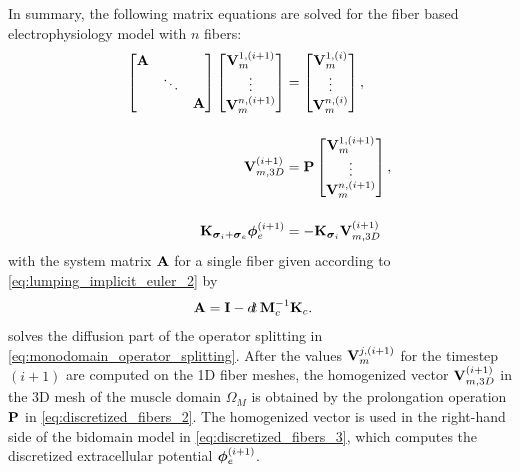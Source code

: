 In summary, the following matrix equations are solved for the fiber based electrophysiology model with $n$ fibers:
\begin{subequations}\label{eq:discretized_fibers}
  \begin{align}
    \left[\begin{array}{@{}ccc@{}}
      \bfA &&\\
      &\ddots&\\
      &&\bfA
    \end{array}\right]
    \left[\begin{array}{@{}c@{}}
      \bfV_{m}^{1,(i+1)}  \\
      \vdots\\
      \bfV_{m}^{n,(i+1)}
    \end{array}\right]
    &= 
    \left[\begin{array}{@{}c@{}}
      \bfV_{m}^{1,(i)}  \\
      \vdots\\
      \bfV_{m}^{n,(i)}
    \end{array}\right],\label{eq:discretized_fibers_1} \\[4mm]
    \bfV_{m,3D}^{(i+1)} &= \bfP \left[\begin{array}{@{}c@{}}
      \bfV_{m}^{1,(i+1)} \label{eq:discretized_fibers_2} \\
      \vdots\\
      \bfV_{m}^{n,(i+1)}
    \end{array}\right],\\[4mm]
    \bfK_{\bfsigma_i + \bfsigma_e} \bfphi_e^{(i+1)} &= -\bfK_{\bfsigma_i} \bfV_{m,3D}^{(i+1)} \label{eq:discretized_fibers_3}
  \end{align}
\end{subequations}
with the system matrix $\textbf{A}$ for a single fiber given according to \cref{eq:lumping_implicit_euler_2} by
\begin{align*}
  \bfA &= \bfI - \dt\,\bfM_c^{-1}\bfK_c.
\end{align*}
 solves the diffusion part of the operator splitting in \cref{eq:monodomain_operator_splitting}. After the values $\textbf{V}_{m}^{j,(i+1)}$ for the timestep $(i+1)$ are computed on the 1D fiber meshes, the homogenized vector $\textbf{V}_{m,3D}^{(i+1)}$ in the 3D mesh of the muscle domain $\Omega_M$ is obtained by the prolongation operation $\textbf{P}$ in \cref{eq:discretized_fibers_2}. The homogenized vector is used in the right-hand side of the bidomain model in \cref{eq:discretized_fibers_3}, which computes the discretized extracellular potential $\boldsymbol{\phi}_e^{(i+1)}$.

